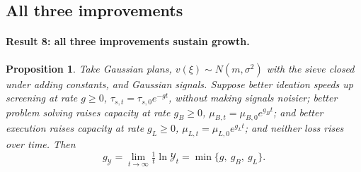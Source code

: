 \documentclass[11pt]{article}
\newtheorem{proposition}{Proposition}
\theoremstyle{remark}
\newcommand{\Ycal}{\mathcal{Y}}
\begin{document}
\subsection{All three improvements}

\paragraph{Result 8: all three improvements sustain growth.}

\begin{proposition}\label{prop:allthree}
Take Gaussian plans, $v(\xi)\sim N(m,\sigma^2)$ with the sieve closed under adding constants, and Gaussian signals. Suppose better ideation speeds up screening at rate $g\ge0$, $\tau_{s,t}=\tau_{s,0}e^{-gt}$, without making signals noisier; better problem solving raises capacity at rate $g_B\ge0$, $\mu_{B,t}=\mu_{B,0}e^{g_Bt}$; and better execution raises capacity at rate $g_L\ge0$, $\mu_{L,t}=\mu_{L,0}e^{g_Lt}$; and neither loss rises over time. Then
\[
g_{\Ycal}=\lim_{t\to\infty}\tfrac1t\ln\Ycal_t=\min\{g,\ g_B,\ g_L\}.
\]
\end{proposition}
\end{document}
